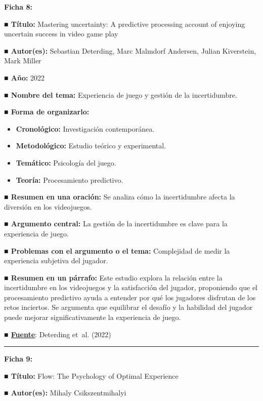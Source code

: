 \documentclass[
  letterpaper,
  DIV=11,
  numbers=noendperiod]{scrreprt}
\begin{document}
\textbf{Ficha 8:}

\textbf{■ Título:} Mastering uncertainty: A predictive processing
account of enjoying uncertain success in video game play

\textbf{■ Autor(es):} Sebastian Deterding, Marc Malmdorf Andersen,
Julian Kiverstein, Mark Miller

\textbf{■ Año:} 2022

\textbf{■ Nombre del tema:} Experiencia de juego y gestión de la
incertidumbre.

\textbf{■ Forma de organizarlo:}

\begin{itemize}
\item
  \textbf{Cronológico:} Investigación contemporánea.
\item
  \textbf{Metodológico:} Estudio teórico y experimental.
\item
  \textbf{Temático:} Psicología del juego.
\item
  \textbf{Teoría:} Procesamiento predictivo.
\end{itemize}

\textbf{■ Resumen en una oración:} Se analiza cómo la incertidumbre
afecta la diversión en los videojuegos.

\textbf{■ Argumento central:} La gestión de la incertidumbre es clave
para la experiencia de juego.

\textbf{■ Problemas con el argumento o el tema:} Complejidad de medir la
experiencia subjetiva del jugador.

\textbf{■ Resumen en un párrafo:} Este estudio explora la relación entre
la incertidumbre en los videojuegos y la satisfacción del jugador,
proponiendo que el procesamiento predictivo ayuda a entender por qué los
jugadores disfrutan de los retos inciertos. Se argumenta que equilibrar
el desafío y la habilidad del jugador puede mejorar significativamente
la experiencia de juego.

\textbf{■
\href{https://www.frontiersin.org/journals/psychology/articles/10.3389/fpsyg.2022.924953/full}{Fuente}}:
Deterding et~al. (2022)

\begin{center}\rule{0.5\linewidth}{0.5pt}\end{center}

\textbf{Ficha 9:}

\textbf{■ Título:} Flow: The Psychology of Optimal Experience

\textbf{■ Autor(es):} Mihaly Csikszentmihalyi
\end{document}
